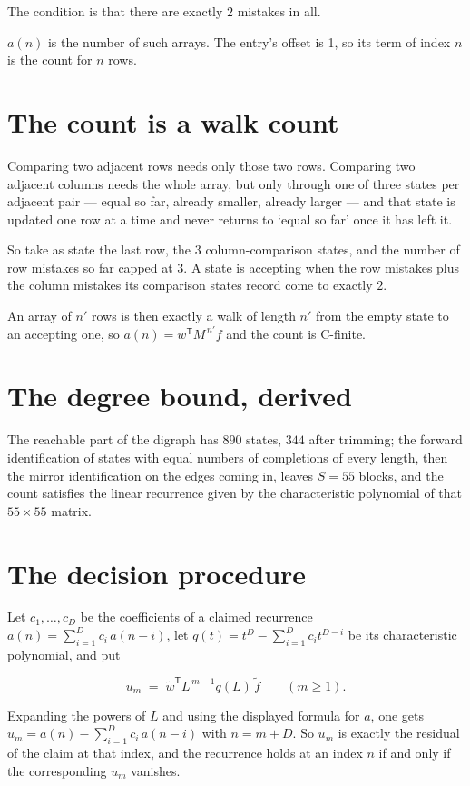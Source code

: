 \documentclass[11pt]{article}
\theoremstyle{definition}
\begin{document}
The condition is that there are exactly $2$ mistakes in all.

$a(n)$ is the number of such arrays. The entry's offset is 1, so its term of index $n$ is the count for $n$ rows.

\section{The count is a walk count}

Comparing two adjacent rows needs only those two rows. Comparing two adjacent columns needs the whole array, but only through one of three states per adjacent pair --- equal so far, already smaller, already larger --- and that state is updated one row at a time and never returns to `equal so far' once it has left it.

So take as state the last row, the $3$ column-comparison states, and the number of row mistakes so far capped at $3$. A state is accepting when the row mistakes plus the column mistakes its comparison states record come to exactly $2$.

An array of $n'$ rows is then exactly a walk of length $n'$ from the empty state to an accepting one, so $a(n) = w^{\mathsf T}M^{\,n'}f$ and the count is C-finite.

\section{The degree bound, derived}

The reachable part of the digraph has $890$ states, $344$ after trimming; the forward identification of states with equal numbers of completions of every length, then the mirror identification on the edges coming in, leaves $S = 55$ blocks, and the count satisfies the linear recurrence given by the characteristic polynomial of that $55\times55$ matrix.

\section{The decision procedure}

Let $c_1,\dots,c_D$ be the coefficients of a claimed recurrence $a(n) = \sum_{i=1}^{D} c_i\,a(n-i)$, let $q(t) = t^{D} - \sum_{i=1}^{D} c_i t^{D-i}$ be its characteristic polynomial, and put

\[u_m \;=\; \tilde w^{\mathsf T} L^{\,m-1} q(L)\,\tilde f \qquad (m \ge 1).\]

Expanding the powers of $L$ and using the displayed formula for $a$, one gets $u_m = a(n) - \sum_{i=1}^{D} c_i\,a(n-i)$ with $n = m + D$. So $u_m$ is exactly the residual of the claim at that index, and the recurrence holds at an index $n$ if and only if the corresponding $u_m$ vanishes.
\end{document}
